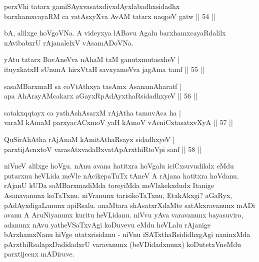 \begin{shl}
perxVhi tatarx gamiSAyxvasatxdivxdAyxlabadhxsidadhx\\
barxhamxcayaRM ca vatAsxyXva AvAM tatarx naqpeV gatw \hfill|| 54 || 
\end{shl}

\begin{artha}
bA, alilxge hoVgoVNa. A videyxya lABavu Agalu barxhamxcayaRdalilx 
nAvibabxrU rAjanalelxV vAsamADoVNa.
\end{artha}


\begin{shl}
yAtu tatarx BavAneVva nAhaM taM ganutxmutasxheV | \\
ituyxkatxH sUnunA hirxVtaH savxyameVva jagAma tamf \hfill|| 55 || 
\end{shl}

\begin{shl}
sasaMBarxmaH sa coVtAthxya tasAmx AsanamAharatf | \\
apa AhArayAMcakarx aGayxRpAdAyxthaRsidadhxyeV \hfill|| 56 || 
\end{shl}

\begin{shl}
satakxqqtayx ca yathAshAsarxM rAjA\s tha tamuvAca ha | \\
varaM kAmaM parxyacACxmoV yaH kAmoV vAcniCxtasatxvXyA \hfill|| 57 || 
\end{shl}

\begin{shl}
QuSirAhAtha rAjAnaM kAmitAthaRsayx sidadhxyeV | \\
parxtijAcnxtoV varasAtxvadaBxvatA\s pArxthiRtoV\s pi sanf \hfill|| 58 || 
\end{shl}

\begin{artha}
niVneV alilxge hoVgu. nAnu avana hatitxra hoVgalu iciCxsuvudilalx eMdu 
putarxnu heVLida meVle nAcikepaTuTx tAneV A rAjana hatitxra hoVdanu. 
rAjanU kUDa saMBarxmadiMda toreyiMda meVlakekxdudx Itanige Asanavanunx 
koTaTxnu. niVranunx tarisikoTaTxnu, EtakAkxgi? aGaRyx, 
pAdAyxdigaLanunx apiRsalu. anaMtara shAsatxrXdaMte satAkxravanunx mADi 
avanu A AruNiyanunx kuritu heVLidanu. niVvu yAva varavanunx 
bayasuviro, adanunx nAvu yatheVSaTxvAgi koDuvevu eMdu heVLalu rAjanige 
bArxhamxNanu hiVge utatxrisidanu - niVnu iSATxthaRsididhxgAgi 
naninxMda pArxthiRsalapxDadidadxrU varavanunx (beVDidadxnunx) 
koDutetxVneMdu parxtijecnx mADiruve.
\end{artha}

